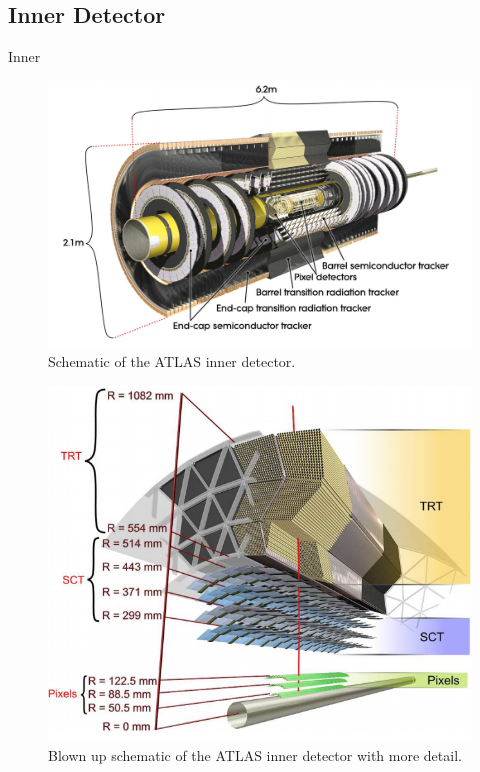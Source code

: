 \subsection{Inner Detector}

Inner
\begin{figure}[h!]
	\centering
	\includegraphics[width=0.5\columnwidth]{../ThesisImages/LHCImages/ATLASInnerDetector.png}
	\caption[Schematic of the ATLAS inner detector.]{Schematic of the ATLAS inner detector.\cite{ATLAS}
	}
	\label{fig:ATLASInnerDet}
\end{figure}


\begin{figure}[h!]
	\centering
	\includegraphics[width=0.5\columnwidth]{../ThesisImages/LHCImages/ATLASInnerStructure.png}
	\caption[Blown up schematic of the ATLAS inner detector with more detail.]{Blown up schematic of the ATLAS inner detector with more detail.\cite{ATLAS}
	}
	\label{fig:ATLASInnerDet}
\end{figure}

